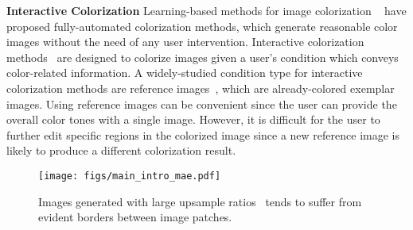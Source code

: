\documentclass[10pt,twocolumn,letterpaper]{article}
\begin{document}
\vspace{+0.1cm}
\noindent \textbf{Interactive Colorization} 
Learning-based methods for image colorization ~\cite{coltran, chromagan, instanceaware, cic, Iizuka2016letcolor, ctest, memo, pixelated2020zhao, ctest} have proposed fully-automated colorization methods, which generate reasonable color images without the need of any user intervention. 
Interactive colorization methods~\cite{zhang2019deep, he2018deep, levin2004, zhang2017, side, lu2020gray2colornet, xu2020stylization, xiao2020example, yin2021yes, li2019automatic, li2021globally} are designed to colorize images given a user's condition which conveys color-related information. 
A widely-studied condition type for interactive colorization methods are reference images~\cite{he2018deep,li2019automatic, zhang2019deep, xiao2020example, lu2020gray2colornet, xu2020stylization, li2021globally, yin2021yes}, which are already-colored exemplar images. 
Using reference images can be convenient since the user can provide the overall color tones with a single image. 
However, it is difficult for the user to further edit specific regions in the colorized image since a new reference image is likely to produce a different colorization result. 

\begin{figure}[t]
    \centering
    \texttt{[image: figs/main\_intro\_mae.pdf]}
\caption{Images generated with large upsample ratios~\cite{mae} tends to suffer from evident borders between image patches. }
    \label{fig:intro_mae}
    \vspace{-0.5cm}
\end{figure}
\end{document}

